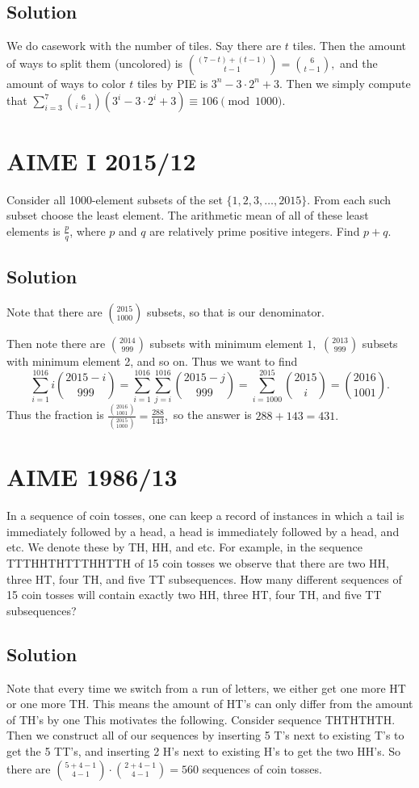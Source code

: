 \documentclass{article}
\begin{document}
\subsection{Solution}
We do casework with the number of tiles. Say there are $t$ tiles. Then the amount of ways to split them (uncolored) is $\binom{(7-t)+(t-1)}{t-1}=\binom{6}{t-1},$ and the amount of ways to color $t$ tiles by PIE is $3^n-3\cdot 2^n+3.$ Then we simply compute that $\sum_{i=3}^{7}\binom{6}{i-1}(3^i-3\cdot 2^i+3)\equiv 106\pmod{1000}.$

\pagebreak\section{AIME I 2015/12}
Consider all 1000-element subsets of the set $\{1, 2, 3,\ldots,2015\}.$ From each such subset choose the least element. The arithmetic mean of all of these least elements is $\frac{p}{q}$, where $p$ and $q$ are relatively prime positive integers. Find $p + q$.

\subsection{Solution}
Note that there are $\binom{2015}{1000}$ subsets, so that is our denominator.

Then note there are $\binom{2014}{999}$ subsets with minimum element $1,$ $\binom{2013}{999}$ subsets with minimum element 2, and so on. Thus we want to find
\[\sum_{i=1}^{1016}i\binom{2015-i}{999}=\sum_{i=1}^{1016}\sum_{j=i}^{1016}\binom{2015-j}{999}=\sum_{i=1000}^{2015}\binom{2015}{i}=\binom{2016}{1001}.\]
Thus the fraction is $\frac{\binom{2016}{1001}}{\binom{2015}{1000}}=\frac{288}{143},$ so the answer is $288+143=431.$

\pagebreak\section{AIME 1986/13}
In a sequence of coin tosses, one can keep a record of instances in which a tail is immediately followed by a head, a head is immediately followed by a head, and etc. We denote these by TH, HH, and etc. For example, in the sequence TTTHHTHTTTHHTTH of 15 coin tosses we observe that there are two HH, three HT, four TH, and five TT subsequences. How many different sequences of 15 coin tosses will contain exactly two HH, three HT, four TH, and five TT subsequences?

\subsection{Solution}
Note that every time we switch from a run of letters, we either get one more HT or one more TH. This means the amount of HT's can only differ from the amount of TH's by one This motivates the following. Consider sequence THTHTHTH. Then we construct all of our sequences by inserting 5 T's next to existing T's to get the 5 TT's, and inserting 2 H's next to existing H's to get the two HH's. So there are $\binom{5+4-1}{4-1}\cdot\binom{2+4-1}{4-1}=560$ sequences of coin tosses.
\end{document}
